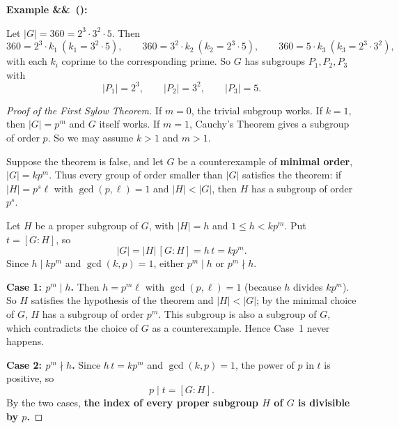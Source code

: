 \documentclass[11pt,a4paper]{article}
\newcounter{examplecnt}[section]
\newenvironment{example}[1][]{
	\stepcounter{examplecnt}
	\begin{examplebox}
		\textbf{\color{exampleColor}Example \arabic{examplecnt}\ifx&#1&\else\ (#1)\fi:} 
	}{
	\end{examplebox}
}
\begin{document}
	\begin{example}
		Let $|G| = 360 = 2^3 \cdot 3^2 \cdot 5$. Then
		\[
		360 = 2^3 \cdot k_1 \ (k_1 = 3^2 \cdot 5), \qquad
		360 = 3^2 \cdot k_2 \ (k_2 = 2^3 \cdot 5), \qquad
		360 = 5 \cdot k_3 \ (k_3 = 2^3 \cdot 3^2),
		\]
		with each $k_i$ coprime to the corresponding prime. So $G$ has subgroups $P_1, P_2, P_3$ with
		\[
		|P_1| = 2^3, \qquad |P_2| = 3^2, \qquad |P_3| = 5 .
		\]
	\end{example}
	
	
	\begin{proof}[Proof of the First Sylow Theorem]
		If $m = 0$, the trivial subgroup works. If $k = 1$, then $|G| = p^m$ and $G$ itself works. If $m = 1$, Cauchy's Theorem gives a subgroup of order $p$. So we may assume $k > 1$ and $m > 1$.
		
		\vspace{0.5em}
		\noindent Suppose the theorem is false, and let $G$ be a counterexample of \textbf{minimal order}, $|G| = k p^m$. Thus every group of order smaller than $|G|$ satisfies the theorem: if $|H| = p^s \ell$ with $\gcd(p, \ell) = 1$ and $|H| < |G|$, then $H$ has a subgroup of order $p^s$.
		
		\vspace{0.5em}
		\noindent Let $H$ be a proper subgroup of $G$, with $|H| = h$ and $1 \le h < k p^m$. Put $t = [G : H]$, so
		\[
		|G| = |H|\, [G:H] = h\, t = k p^m .
		\]
		Since $h \mid k p^m$ and $\gcd(k,p) = 1$, either $p^m \mid h$ or $p^m \nmid h$.
		
		\vspace{0.5em}
		\noindent \textbf{Case 1: $p^m \mid h$.} Then $h = p^m \ell$ with $\gcd(p, \ell) = 1$ (because $h$ divides $k p^m$). So $H$ satisfies the hypothesis of the theorem and $|H| < |G|$; by the minimal choice of $G$, $H$ has a subgroup of order $p^m$. This subgroup is also a subgroup of $G$, which contradicts the choice of $G$ as a counterexample. Hence Case~1 never happens.
		
		\vspace{0.5em}
		\noindent \textbf{Case 2: $p^m \nmid h$.} Since $h\,t = k p^m$ and $\gcd(k,p) = 1$, the power of $p$ in $t$ is positive, so
		\[
		p \mid t = [G : H] .
		\]
		By the two cases, \textbf{the index of every proper subgroup $H$ of $G$ is divisible by $p$.}
		

\end{proof}
\end{document}
